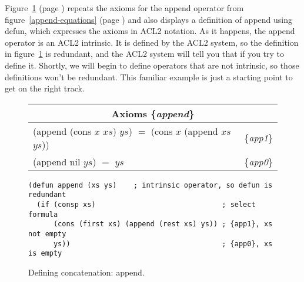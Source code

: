 Figure~\ref{fig:append-defun} (page \pageref{fig:append-defun})
repeats the axioms for the \textsf{append} operator from
figure~\ref{append-equations} (page \pageref{append-equations})
and also displays a definition of \textsf{append} using \textsf{defun},
which expresses the axioms in ACL2 notation.
As it happens, the \textsf{append} operator is an ACL2 intrinsic.
It is defined by the ACL2 system, so the definition
in figure~\ref{fig:append-defun} is redundant,
and the ACL2 system will tell you that if you try to define it.
Shortly, we will begin to define operators that are not
intrinsic, so those definitions won't be redundant.
This familiar example is just
a starting point to get on the right track.

\begin{figure}
\begin{center}
\begin{tabular}{ll}
\multicolumn{2}{c}{Axioms \{\emph{append}\}} \\
\hline
\textsf{(append (cons $x$ $xs$) $ys$)} $=$ \textsf{(cons $x$ (append $xs$ $ys$))} & \{\emph{app1}\} \\
\textsf{(append nil $ys$)} $=$  $ys$                                     & \{\emph{app0}\} \\
\end{tabular}
\begin{code}
\begin{verbatim}
(defun append (xs ys)    ; intrinsic operator, so defun is redundant
  (if (consp xs)                              ; select formula
      (cons (first xs) (append (rest xs) ys)) ; {app1}, xs not empty
      ys))                                    ; {app0}, xs is empty
\end{verbatim}
\end{code}
\end{center}
\caption{Defining concatenation: \textsf{append}.}
\label{fig:append-defun}
\end{figure}

